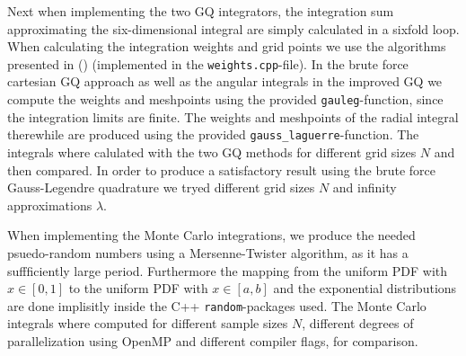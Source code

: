 \documentclass[twocolumn]{aastex62}
\begin{document}
Next when implementing the two GQ integrators, the integration sum approximating
the six-dimensional integral are simply calculated in a sixfold loop. When
calculating the integration weights and grid points we use the algorithms
presented in (\cite{press:2007}) (implemented in the \texttt{weights.cpp}-file).
In the brute force cartesian GQ approach as well as the angular integrals in the
improved GQ we compute the weights and meshpoints using the provided
\texttt{gauleg}-function, since the integration limits are finite. The weights
and meshpoints of the radial integral therewhile are produced using the provided
\texttt{gauss\_laguerre}-function. The integrals where calulated with the two GQ
methods for different grid sizes $N$ and then compared. In order to produce a
satisfactory result using the brute force Gauss-Legendre quadrature we tryed
different grid sizes $N$ and infinity approximations $\lambda$.

When implementing the Monte Carlo integrations, we produce the needed
psuedo-random numbers using a Mersenne-Twister algorithm, as it has a
suffficiently large period. Furthermore the mapping from the uniform PDF with
$x\in[0,1]$ to the uniform PDF with $x\in[a,b]$ and the exponential
distributions are done implisitly inside the C++ \texttt{random}-packages used.
The Monte Carlo integrals where computed for different sample sizes $N$,
different degrees of parallelization using OpenMP and different compiler flags,
for comparison. 
\end{document}
